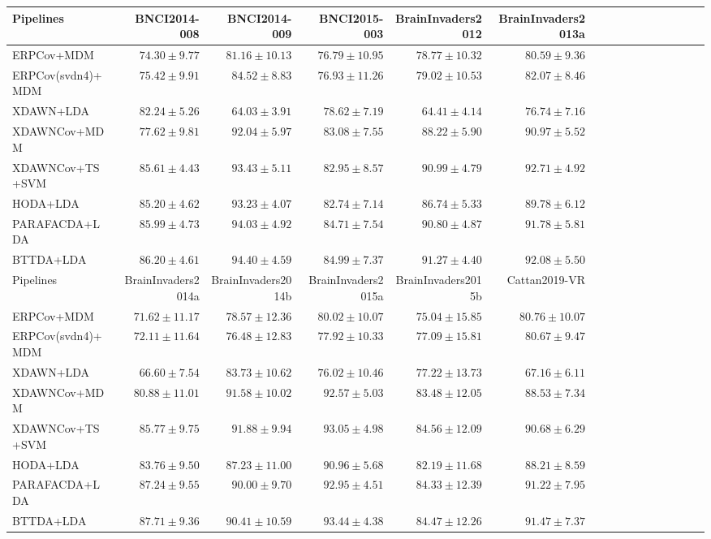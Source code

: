 \begin{tabular}{@{}lrrrrrrrrrrrrrrr@{}}
\toprule
Pipelines & BNCI2014-008 & BNCI2014-009 & BNCI2015-003 & BrainInvaders2012 & BrainInvaders2013a \\
\midrule
ERPCov+MDM & $74.30\pm9.77$ & $81.16\pm10.13$ & $76.79\pm10.95$ & $78.77\pm10.32$ & $80.59\pm9.36$ \\
ERPCov(svdn4)+MDM & $75.42\pm9.91$ & $84.52\pm8.83$ & $76.93\pm11.26$ & $79.02\pm10.53$ & $82.07\pm8.46$ \\
XDAWN+LDA & $82.24\pm5.26$ & $64.03\pm3.91$ & $78.62\pm7.19$ & $64.41\pm4.14$ & $76.74\pm7.16$ \\
XDAWNCov+MDM & $77.62\pm9.81$ & $92.04\pm5.97$ & $83.08\pm7.55$ & $88.22\pm5.90$ & $90.97\pm5.52$ \\
XDAWNCov+TS+SVM & $85.61\pm4.43$ & $93.43\pm5.11$ & $82.95\pm8.57$ & $90.99\pm4.79$ & \boldmath$92.71\pm4.92$ \\HODA+LDA & $85.20\pm4.62$ & $93.23\pm4.07$ & $82.74\pm7.14$ & $86.74\pm5.33$ & $89.78\pm6.12$ \\
PARAFACDA+LDA & $85.99\pm4.73$ & $94.03\pm4.92$ & $84.71\pm7.54$ & $90.80\pm4.87$ & $91.78\pm5.81$ \\
BTTDA+LDA & \boldmath$86.20\pm4.61$ & \boldmath$94.40\pm4.59$ & \boldmath$84.99\pm7.37$ & \boldmath$91.27\pm4.40$ & $92.08\pm5.50$ \\
\midrule 
Pipelines & BrainInvaders2014a & BrainInvaders2014b & BrainInvaders2015a & BrainInvaders2015b & Cattan2019-VR \\
\midrule
ERPCov+MDM & $71.62\pm11.17$ & $78.57\pm12.36$ & $80.02\pm10.07$ & $75.04\pm15.85$ & $80.76\pm10.07$ \\
ERPCov(svdn4)+MDM & $72.11\pm11.64$ & $76.48\pm12.83$ & $77.92\pm10.33$ & $77.09\pm15.81$ & $80.67\pm9.47$ \\
XDAWN+LDA & $66.60\pm7.54$ & $83.73\pm10.62$ & $76.02\pm10.46$ & $77.22\pm13.73$ & $67.16\pm6.11$ \\
XDAWNCov+MDM & $80.88\pm11.01$ & $91.58\pm10.02$ & $92.57\pm5.03$ & $83.48\pm12.05$ & $88.53\pm7.34$ \\
XDAWNCov+TS+SVM & $85.77\pm9.75$ & \boldmath$91.88\pm9.94$ & $93.05\pm4.98$ & \boldmath$84.56\pm12.09$ & $90.68\pm6.29$ \\HODA+LDA & $83.76\pm9.50$ & $87.23\pm11.00$ & $90.96\pm5.68$ & $82.19\pm11.68$ & $88.21\pm8.59$ \\
PARAFACDA+LDA & $87.24\pm9.55$ & $90.00\pm9.70$ & $92.95\pm4.51$ & $84.33\pm12.39$ & $91.22\pm7.95$ \\
BTTDA+LDA & \boldmath$87.71\pm9.36$ & $90.41\pm10.59$ & \boldmath$93.44\pm4.38$ & $84.47\pm12.26$ & \boldmath$91.47\pm7.37$ \\


\end{tabular}
